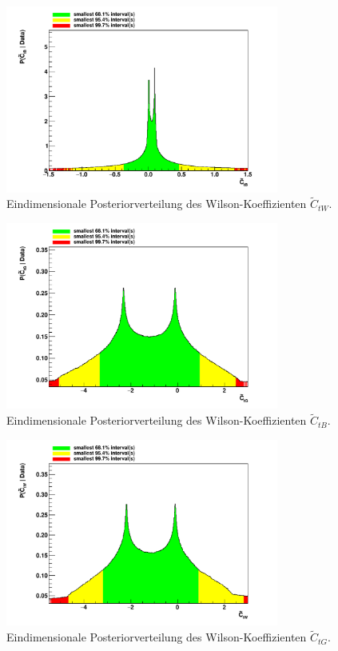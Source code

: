 \begin{figure}
    \centering
    \includegraphics[width=0.8\textwidth]{Plots/ctb.pdf}
    \caption{Eindimensionale Posteriorverteilung des Wilson-Koeffizienten $\tilde{C}_{tW}$.}
    \label{fig:ctw}
\end{figure}
\begin{figure}
    \centering
    \includegraphics[width=0.8\textwidth]{Plots/ctg.pdf}
    \caption{Eindimensionale Posteriorverteilung des Wilson-Koeffizienten $\tilde{C}_{tB}$.}
    \label{fig:ctb}
\end{figure}
\begin{figure}
    \centering
    \includegraphics[width=0.8\textwidth]{Plots/ctw.pdf}
    \caption{Eindimensionale Posteriorverteilung des Wilson-Koeffizienten $\tilde{C}_{tG}$.}
    \label{fig:ctg}
\end{figure}
